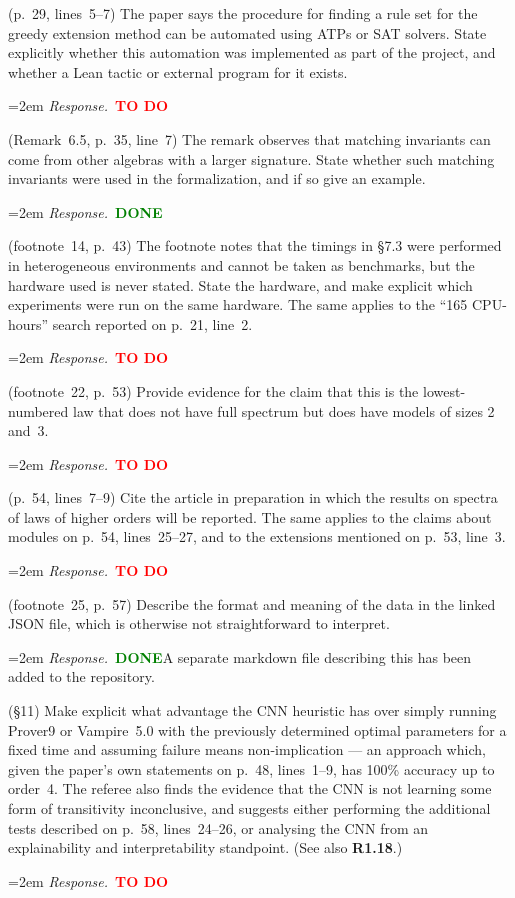 \documentclass[11pt]{amsart}
\newcommand{\todo}{\textcolor{red}{\textbf{TO DO}}}
\newcommand{\done}{\textcolor{green}{\textbf{DONE}}}
\newcommand{\response}[1]{%
  \par\smallskip
  \noindent\hangindent=2em\hangafter=1
  \textit{Response.}\ #1
  \par\smallskip}
\begin{document}
\begin{requests}
\item (p.~29, lines~5--7) The paper says the procedure for finding a rule set for the
greedy extension method can be automated using ATPs or SAT solvers. State explicitly
whether this automation was implemented as part of the project, and whether a Lean
tactic or external program for it exists.
\response{\todo}

\item (Remark~6.5, p.~35, line~7) The remark observes that matching invariants can come
from other algebras with a larger signature. State whether such matching invariants
were used in the formalization, and if so give an example.
\response{\done}

\item (footnote~14, p.~43) The footnote notes that the timings in \S7.3 were performed
in heterogeneous environments and cannot be taken as benchmarks, but the hardware used
is never stated. State the hardware, and make explicit which experiments were run on
the same hardware. The same applies to the ``165 CPU-hours'' search reported on p.~21,
line~2.
\response{\todo}

\item (footnote~22, p.~53) Provide evidence for the claim that this is the
lowest-numbered law that does not have full spectrum but does have models of sizes
2 and~3.
\response{\todo}

\item (p.~54, lines~7--9) Cite the article in preparation in which the results on
spectra of laws of higher orders will be reported. The same applies to the claims about
modules on p.~54, lines~25--27, and to the extensions mentioned on p.~53, line~3.
\response{\todo}

\item (footnote~25, p.~57) Describe the format and meaning of the data in the linked
JSON file, which is otherwise not straightforward to interpret.
\response{\done A separate markdown file describing this has been added to the repository.}

\item (\S11) Make explicit what advantage the CNN heuristic has over simply running
Prover9 or Vampire~5.0 with the previously determined optimal parameters for a fixed
time and assuming failure means non-implication --- an approach which, given the
paper's own statements on p.~48, lines~1--9, has 100\% accuracy up to order~4. The
referee also finds the evidence that the CNN is not learning some form of transitivity
inconclusive, and suggests either performing the additional tests described on p.~58,
lines~24--26, or analysing the CNN from an explainability and interpretability
standpoint. (See also \textbf{R1.18}.)
\response{\todo}


\end{requests}
\end{document}
